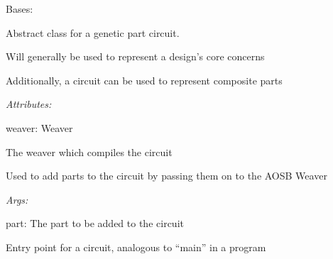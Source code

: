\documentclass[letterpaper,10pt,english]{sphinxmanual}
\begin{document}
\begin{fulllineitems}
\label{modules/index:aosb.core.Circuit}
Bases: {\hyperref[modules/index:aosb.core.Part]{}}

Abstract class for a genetic part circuit.

\begin{DUlineblock}{0em}
\item[] Will generally be used to represent a design's core concerns
\item[] Additionally, a circuit can be used to represent composite parts
\end{DUlineblock}

\begin{DUlineblock}{0em}
\item[] \emph{Attributes:}
\item[]
\begin{DUlineblock}{\DUlineblockindent}
\item[] weaver: Weaver
\item[]
\begin{DUlineblock}{\DUlineblockindent}
\item[] The weaver which compiles the circuit
\end{DUlineblock}
\end{DUlineblock}
\end{DUlineblock}

\begin{fulllineitems}
\label{modules/index:aosb.core.Circuit.addPart}
Used to add parts to the circuit by passing them on to the AOSB Weaver

\begin{DUlineblock}{0em}
\item[] \emph{Args:}
\item[]
\begin{DUlineblock}{\DUlineblockindent}
\item[] part: The part to be added to the circuit
\end{DUlineblock}
\end{DUlineblock}

\end{fulllineitems}


\begin{fulllineitems}
\label{modules/index:aosb.core.Circuit.mainCircuit}
Entry point for a circuit, analogous to ``main'' in a program


\end{fulllineitems}
\end{fulllineitems}
\end{document}
